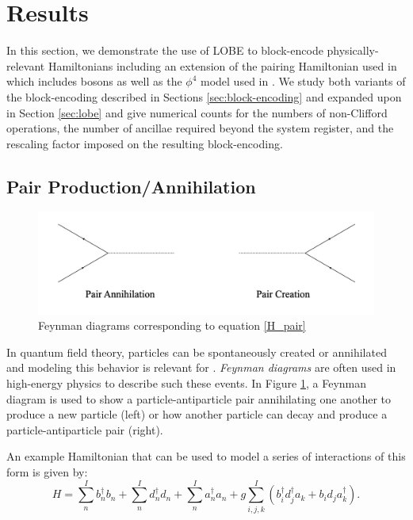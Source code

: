 \section{Results}
\label{sec:results}

In this section, we demonstrate the use of LOBE to block-encode physically-relevant Hamiltonians including an extension of the pairing Hamiltonian used in \cite{liu2024efficient} which includes bosons as well as the $\phi^4$ model used in .
We study both variants of the block-encoding described in Sections \ref{sec:block-encoding} and expanded upon in Section \ref{sec:lobe} and give numerical counts for the numbers of non-Clifford operations, the number of ancillae required beyond the system register, and the rescaling factor imposed on the resulting block-encoding.

\subsection{Pair Production/Annihilation}

\begin{figure}[h]
    \label{fig:feynman}
    \includegraphics[width = 0.7\linewidth]{figures/creation_annihilate.png}
    \caption{Feynman diagrams corresponding to equation \ref{H_pair}}
\end{figure}


In quantum field theory, particles can be spontaneously created or annihilated and modeling this behavior is relevant for .
\textit{Feynman diagrams} are often used in high-energy physics to describe such these events.
In Figure \ref{fig:feynman}, a Feynman diagram is used to show a particle-antiparticle pair annihilating one another to produce a new particle (left) or how another particle can decay and produce a particle-antiparticle pair (right).

An example Hamiltonian that can be used to model a series of interactions of this form is given by:
\begin{equation}
    \label{eq:pairing-hamiltonian}
    H = \sum_n^{I} b_n^\dagger b_n + \sum_n^{I} d_n^\dagger d_n + \sum_n^{I} a_n^\dagger a_n + g\sum_{i,j,k}^{I} \left(b_i^\dagger d_j^\dagger a_k + b_i d_j a_k^\dagger \right).
\end{equation}

